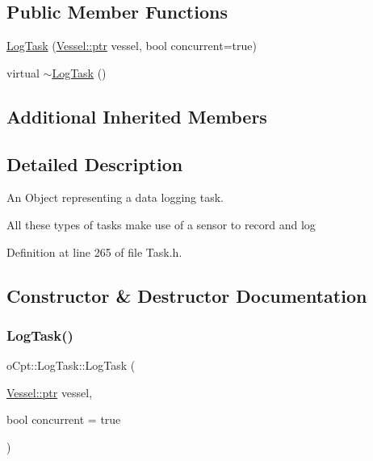 \subsection*{Public Member Functions}
\begin{DoxyCompactItemize}
\item 
\hyperlink{classo_cpt_1_1_log_task_a91f34df5c1732af406c7c7409ac8cead}{Log\+Task} (\hyperlink{classo_cpt_1_1i_vessel_a43711a596f3bdfd0ca732ed3901edc97}{Vessel\+::ptr} vessel, bool concurrent=true)
\item 
virtual \hyperlink{classo_cpt_1_1_log_task_a0f80363644cbe0a9c17e78198d466788}{$\sim$\+Log\+Task} ()
\end{DoxyCompactItemize}
\subsection*{Additional Inherited Members}


\subsection{Detailed Description}
An Object representing a data logging task. 

All these types of tasks make use of a sensor to record and log 

Definition at line 265 of file Task.\+h.



\subsection{Constructor \& Destructor Documentation}
\hypertarget{classo_cpt_1_1_log_task_a91f34df5c1732af406c7c7409ac8cead}{}\label{classo_cpt_1_1_log_task_a91f34df5c1732af406c7c7409ac8cead} 
\subsubsection{\texorpdfstring{Log\+Task()}{LogTask()}}
{\footnotesize\ttfamily o\+Cpt\+::\+Log\+Task\+::\+Log\+Task (\begin{DoxyParamCaption}\item[{\hyperlink{classo_cpt_1_1i_vessel_a43711a596f3bdfd0ca732ed3901edc97}{Vessel\+::ptr}}]{vessel,  }\item[{bool}]{concurrent = {\ttfamily true} }\end{DoxyParamCaption})}


